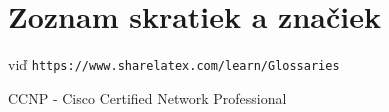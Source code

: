 \chapter*{Zoznam skratiek a značiek}

viď \texttt{https://www.sharelatex.com/learn/Glossaries}

CCNP - Cisco Certified Network Professional